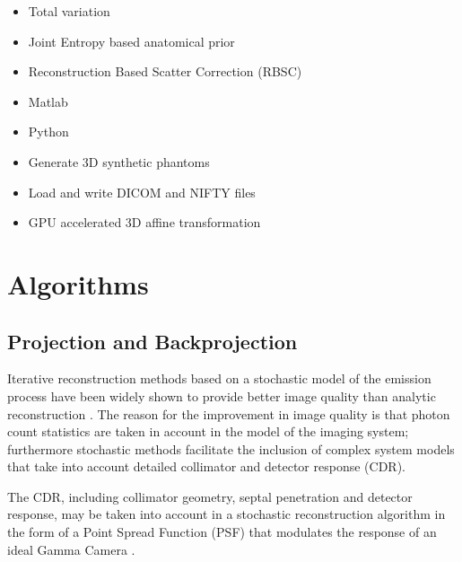 \documentclass[12pt,a4paper]{report}
\begin{document}
\begin{itemize}
  \item Total variation
  \item Joint Entropy based anatomical prior
\end{itemize}

\begin{itemize}
  \item Reconstruction Based Scatter Correction (RBSC)
\end{itemize}

\begin{itemize}
  \item Matlab
  \item Python
\end{itemize}

\begin{itemize}
  \item Generate 3D synthetic phantoms
  \item Load and write DICOM and NIFTY files
  \item GPU accelerated 3D affine transformation
\end{itemize}


\section{Algorithms}
\subsection{Projection and Backprojection}
Iterative reconstruction methods based on a stochastic model of the emission process \cite{shepp_1982,qi_2006,borman_2004} 
have been widely shown to provide better image quality than analytic reconstruction \cite{johnson_1997,frese_2003}. 
The reason for the improvement in image quality is that photon count statistics are taken in account in the model of the 
imaging system; furthermore stochastic methods facilitate the inclusion of complex system models that take into account 
detailed collimator and detector response (CDR). 

\noindent The CDR, including collimator geometry, septal penetration and detector response, may be taken
into account in a stochastic reconstruction algorithm in the form of a Point
Spread Function (PSF) that modulates the response of an
ideal Gamma Camera \cite{zeng_1992}\cite{rahmim_2008}.
\end{document}
